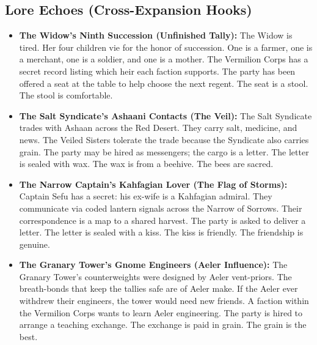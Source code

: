 \subsection*{Lore Echoes (Cross-Expansion Hooks)}
\begin{itemize}
  \item \textbf{The Widow's Ninth Succession (Unfinished Tally):} The Widow is tired. Her four children vie for the honor of succession. One is a farmer, one is a merchant, one is a soldier, and one is a mother. The Vermilion Corps has a secret record listing which heir each faction supports. The party has been offered a seat at the table to help choose the next regent. The seat is a stool. The stool is comfortable.

  \item \textbf{The Salt Syndicate's Ashaani Contacts (The Veil):} The Salt Syndicate trades with Ashaan across the Red Desert. They carry salt, medicine, and news. The Veiled Sisters tolerate the trade because the Syndicate also carries grain. The party may be hired as messengers; the cargo is a letter. The letter is sealed with wax. The wax is from a beehive. The bees are sacred.

  \item \textbf{The Narrow Captain's Kahfagian Lover (The Flag of Storms):} Captain Sefu has a secret: his ex-wife is a Kahfagian admiral. They communicate via coded lantern signals across the Narrow of Sorrows. Their correspondence is a map to a shared harvest. The party is asked to deliver a letter. The letter is sealed with a kiss. The kiss is friendly. The friendship is genuine.

  \item \textbf{The Granary Tower's Gnome Engineers (Aeler Influence):} The Granary Tower's counterweights were designed by Aeler vent-priors. The breath-bonds that keep the tallies safe are of Aeler make. If the Aeler ever withdrew their engineers, the tower would need new friends. A faction within the Vermilion Corps wants to learn Aeler engineering. The party is hired to arrange a teaching exchange. The exchange is paid in grain. The grain is the best.
\end{itemize}

